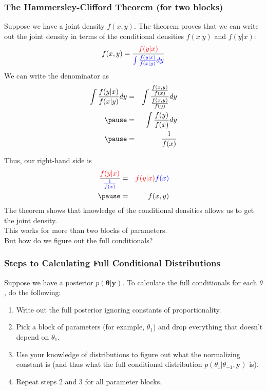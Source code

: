 \documentclass[handout]{beamer}
\begin{document}
\begin{frame}
\frametitle{The Hammersley-Clifford Theorem (for two blocks)}
\pause
Suppose we have a joint density $f(x,y)$.  \pause The theorem proves
that we can write out the joint density in terms of the conditional
densities $f(x|y)$ and $f(y|x)$:
\pause
\begin{eqnarray*}
f(x,y) = \frac{\textcolor{red}{f(y|x)}}{\textcolor{blue}{\int \frac{f(y|x)}{f(x|y)} dy}}
\end{eqnarray*}
\pause
We can write the denominator as
\color{blue}
\begin{eqnarray*}
\int \frac{f(y|x)}{f(x|y)} dy &=& \int
\frac{\frac{f(x,y)}{f(x)}}{\frac{f(x,y)}{f(y)}} dy \\
\pause
&=& \int \frac{f(y)}{f(x)} dy\\
\pause
&=& \frac{1}{f(x)}
\end{eqnarray*}
\color{black}
\end{frame}

\begin{frame}
Thus, our right-hand side is
\begin{eqnarray*}
\frac{\red{f(y|x)}}{\blue{\frac{1}{f(x)}}} &=& \red{f(y|x)} \blue{f(x)}\\
\pause
&=& f(x,y)
\end{eqnarray*}
\pause
The theorem shows that knowledge of the conditional densities allows
us to get the joint density.  \\
\pause
\bigskip
This works for more than two blocks of parameters. \\
\pause
\bigskip
But how do we figure out the full conditionals?
\end{frame}

\begin{frame}
\frametitle{Steps to Calculating Full Conditional Distributions}
\pause
Suppose we have a posterior $p(\bm{\theta} | \bm{y})$.  \pause
To calculate the full conditionals for each $\theta$, do the following:
\pause
\bigskip
\begin{enumerate}
\item Write out the full posterior ignoring constants of proportionality.
\pause
\item Pick a block of parameters (for example, $\theta_1$) and drop
everything that doesn't depend on $\theta_1$.
\pause
\item Use your knowledge of distributions to figure out what the
normalizing constant is (and thus what the full
conditional distribution $p(\theta_1 | \theta_{-1}, \bm{y})$ is).
\pause
\item Repeat steps 2 and 3 for all parameter blocks.
\end{enumerate}
\end{frame}
\end{document}
